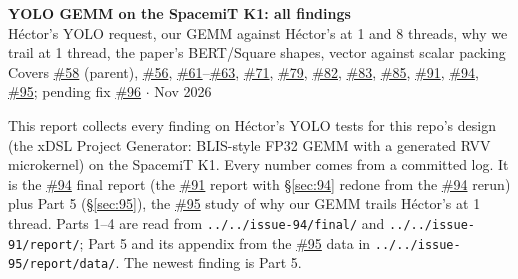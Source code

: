 \documentclass[10pt,a4paper]{article}
\newcommand{\iss}[1]{\href{https://github.com/JieGH/RVV_code_gen_via_MLIR_xDSL/issues/#1}{\##1}}
\begin{document}
\begin{center}
{\Large\bfseries YOLO GEMM on the SpacemiT K1: all findings}\\[4pt]
H\'ector's YOLO request, our GEMM against H\'ector's at 1 and 8 threads, why we trail at 1 thread, the paper's BERT/Square shapes, vector against scalar packing\\[2pt]
Covers \iss{58} (parent), \iss{56}, \iss{61}--\iss{63}, \iss{71}, \iss{79}, \iss{82}, \iss{83}, \iss{85}, \iss{91}, \iss{94}, \iss{95}; pending fix \iss{96} \quad$\cdot$ Nov 2026
\end{center}

\noindent This report collects every finding on H\'ector's YOLO tests for this repo's design (the xDSL Project Generator:
BLIS-style FP32 GEMM with a generated RVV microkernel) on the SpacemiT K1. Every number comes from a committed log. It is the \iss{94} final report (the \iss{91} report with \S\ref{sec:94} redone from the \iss{94} rerun) plus Part 5 (\S\ref{sec:95}), the \iss{95} study of why our GEMM trails H\'ector's at 1 thread. Parts 1--4 are read from \texttt{../../issue-94/final/} and \texttt{../../issue-91/report/}; Part 5 and its appendix from the \iss{95} data in \texttt{../../issue-95/report/data/}. The newest finding is Part 5.








\end{document}
